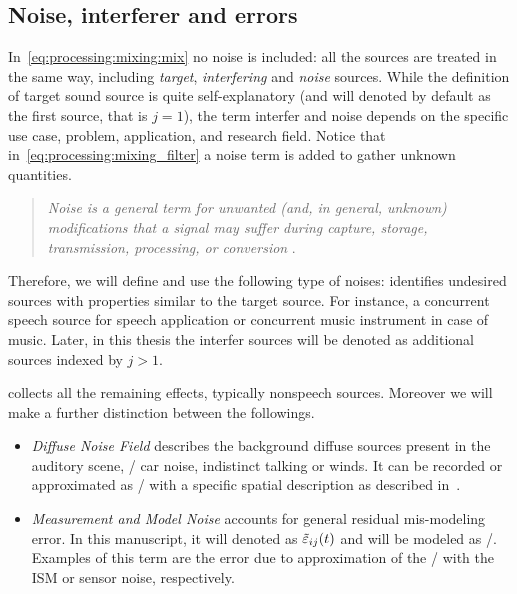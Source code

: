\subsection{Noise, interferer and errors}
In~\cref{eq:processing:mixing:mix} no noise is included:
all the sources are treated in the same way, including \textit{target}, \textit{interfering} and \textit{noise} sources.
While the definition of target sound source is quite self-explanatory (and will denoted by default as the first source, that is $j = 1$), the term interfer and noise depends on the specific use case, problem, application, and research field.
Notice that in~\cref{eq:processing:mixing_filter} a noise term is added to gather unknown quantities.
\begin{quote}
    \textit{Noise is a general term for unwanted (and, in general, unknown) modifications that a signal may suffer during capture, storage, transmission, processing, or conversion}
    .
\end{quote}
Therefore, we will define and use the following type of noises:
 identifies undesired sources with properties similar to the target source.
For instance, a concurrent speech source for speech application or concurrent music instrument in case of music.
Later, in this thesis the interfer sources will be denoted as additional sources indexed by $j > 1$.

 collects all the remaining effects, typically nonspeech sources.
Moreover we will make a further distinction between the followings.
\begin{itemize}
    \item
    \textit{Diffuse Noise Field} describes the background diffuse sources present in the auditory scene, \eg/ car noise, indistinct talking or winds.
    It can be recorded or approximated as \AWGN/ with a specific spatial description as described in~.
    \item
    \textit{Measurement and Model Noise} accounts for general residual mis-modeling error.
    In this manuscript, it will denoted as $\tilde{\varepsilon}_{ij}( t)$ and will be modeled as \AWGN/.
    Examples of this term are the error due to approximation of the \RIR/ with the \acf{ISM} or sensor noise, respectively.
\end{itemize}

